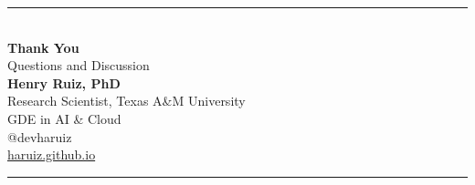 \documentclass[aspectratio=169]{beamer}
\begin{document}
\begin{frame}[plain]
  \centering
  \vspace{0.6cm}
  {\color{tamumaroon}\rule{0.75\textwidth}{1.2pt}}\\[0.65cm]
  {\Huge\color{tamumaroon}\textbf{Thank You}}\\[0.45cm]
  {\Large Questions and Discussion}\\[0.75cm]

  {\large\textbf{Henry Ruiz, PhD}}\\[0.15cm]
  Research Scientist, Texas A\&M University\\
  GDE in AI \& Cloud\\[0.35cm]
  @devharuiz\\
  \href{https://haruiz.github.io/}{haruiz.github.io}\\[0.65cm]
  {\color{tamumaroon}\rule{0.75\textwidth}{0.6pt}}
\end{frame}
\end{document}
